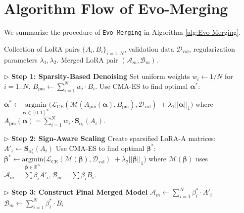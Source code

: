 \section{Algorithm Flow of Evo-Merging}
\label{alg: Algorithm flow of Evo-Merging}
We summarize the procedure of \texttt{Evo-Merging} in Algorithm \ref{alg:Evo-Merging}.
\begin{algorithm}[htbp]
\footnotesize
\caption{Evo-Merging Procedure}
\label{alg:Evo-Merging}
\begin{algorithmic}[1] 
\REQUIRE Collection of LoRA pairs $\{A_i, B_i\}_{i=1..N}$, validation data $\mathcal{D}_{\text{val}}$, regularization parameters $\lambda_1, \lambda_2$.
\ENSURE Merged LoRA pair $(\mathcal{A}_m, \mathcal{B}_m)$.
\STATE

\STATE $\triangleright$ \textbf{Step 1: Sparsity-Based Denoising}
\STATE Set uniform weights $w_i \gets 1/N$ for $i=1..N$.
\STATE $B_{\text{pm}} \gets \sum_{i=1}^{N} w_i \cdot B_i$.
\STATE Use CMA-ES to find optimal $\bm{\alpha}^*$:

    \STATE \quad $\bm{\alpha}^* \gets \underset{\bm{\alpha} \in [0,1]^N}{\text{argmin}} \Big( \mathcal{L}_{\text{CE}}(\mathcal{M}(A_{\text{pm}}(\bm{\alpha}), B_{\text{pm}}), \mathcal{D}_{\text{val}})$
    \STATE \quad \qquad\qquad\qquad\quad ${} + \lambda_1 ||\bm{\alpha}||_1 \Big)$
    \STATE \quad where $A_{\text{pm}}(\bm{\alpha}) = \sum_{i=1}^{N} w_i \cdot \mathbf{S}_{\alpha_i}(A_i)$.
\STATE

\STATE $\triangleright$ \textbf{Step 2: Sign-Aware Scaling}
\STATE Create sparsified LoRA-A matrices:
    \STATE $A'_i \gets \mathbf{S}_{\alpha_i^*}(A_i)$
\ENDFOR
\STATE Use CMA-ES to find optimal $\bm{\beta}^*$:
    \STATE \quad $\bm{\beta}^* \gets \underset{\bm{\beta} \in \mathbb{R}^N}{\text{argmin}} \Big( \mathcal{L}_{\text{CE}}(\mathcal{M}(\bm{\beta}), \mathcal{D}_{\text{val}})$
    \STATE \quad \qquad\qquad\qquad ${} + \lambda_2 ||\bm{\beta}||_1 \Big)$
    \STATE \quad where $\mathcal{M}(\bm{\beta})$ uses $\mathcal{A}_m = \sum \beta_i A'_i, \mathcal{B}_m = \sum \beta_i B_i$.
\STATE

\STATE $\triangleright$ \textbf{Step 3: Construct Final Merged Model}
\STATE $\mathcal{A}_m \gets \sum_{i=1}^{N} \beta_i^* \cdot A'_i$
\STATE $\mathcal{B}_m \gets \sum_{i=1}^{N} \beta_i^* \cdot B_i$
\end{algorithmic}
\end{algorithm}

\clearpage
\balance




